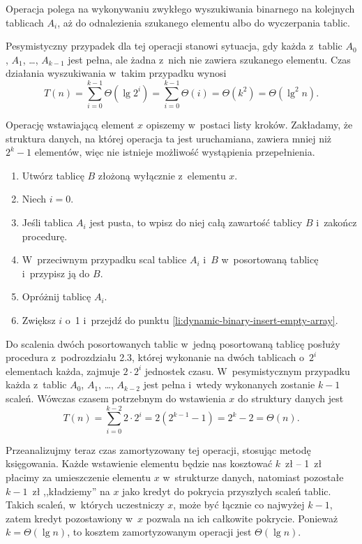 
\subproblem %
Operacja  polega na wykonywaniu zwykłego wyszukiwania binarnego na kolejnych tablicach $A_i$, aż do odnalezienia szukanego elementu albo do wyczerpania tablic.

Pesymistyczny przypadek dla tej operacji stanowi sytuacja, gdy każda z~tablic $A_0$, $A_1$, \dots, $A_{k-1}$ jest pełna, ale żadna z~nich nie zawiera szukanego elementu.
Czas działania wyszukiwania w~takim przypadku wynosi
\[
	T(n) = \sum_{i=0}^{k-1}\Theta(\lg2^i) = \sum_{i=0}^{k-1}\Theta(i) = \Theta(k^2) = \Theta(\lg^2n).
\]

\subproblem %
Operację  wstawiającą element $x$ opiszemy w~postaci listy kroków.
Zakładamy, że struktura danych, na której operacja ta jest uruchamiana, zawiera mniej niż $2^k-1$ elementów, więc nie istnieje możliwość wystąpienia przepełnienia.
\begin{enumerate}
\item Utwórz tablicę $B$ złożoną wyłącznie z~elementu $x$.
\item Niech $i=0$.
\item Jeśli tablica $A_i$ jest pusta, to wpisz do niej całą zawartość tablicy $B$ i~zakończ procedurę. \label{li:dynamic-binary-insert-empty-array}
\item W~przeciwnym przypadku scal tablice $A_i$ i~$B$ w~posortowaną tablicę i~przypisz ją do $B$.
\item Opróżnij tablicę $A_i$.
\item Zwiększ $i$ o~1 i~przejdź do punktu \ref{li:dynamic-binary-insert-empty-array}.
\end{enumerate}
Do scalenia dwóch posortowanych tablic w~jedną posortowaną tablicę posłuży procedura  z~podrozdziału 2.3, której wykonanie na dwóch tablicach o~$2^i$ elementach każda, zajmuje $2\cdot2^i$ jednostek czasu.
W~pesymistycznym przypadku każda z~tablic $A_0$, $A_1$, \dots, $A_{k-2}$ jest pełna i~wtedy wykonanych zostanie $k-1$ scaleń.
Wówczas czasem potrzebnym do wstawienia $x$ do struktury danych jest
\[
	T(n) = \sum_{i=0}^{k-2}2\cdot2^i = 2(2^{k-1}-1) = 2^k-2 = \Theta(n).
\]

Przeanalizujmy teraz czas zamortyzowany tej operacji, stosując metodę księgowania.
Każde wstawienie elementu będzie nas kosztować $k$~zł -- 1~zł płacimy za umieszczenie elementu $x$ w~strukturze danych, natomiast pozostałe $k-1$~zł ,,kładziemy'' na $x$ jako kredyt do pokrycia przyszłych scaleń tablic.
Takich scaleń, w~których uczestniczy $x$, może być łącznie co najwyżej $k-1$, zatem kredyt pozostawiony w~$x$ pozwala na ich całkowite pokrycie.
Ponieważ $k=\Theta(\lg n)$, to kosztem zamortyzowanym operacji  jest $\Theta(\lg n)$.


